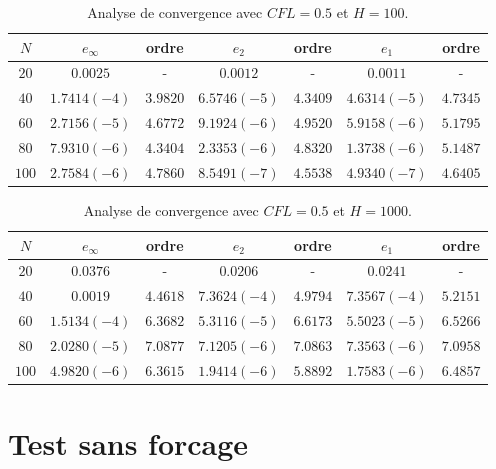 \begin{table}[h]
\begin{center}
\begin{tabular}{c|c|c|c|c|c|c}
$N$ & $e_{\infty}$ & ordre & $e_2$ & ordre & $e_1$ & ordre \\ 
\hline 
\hline
$20$ & $0.0025$ & - & $0.0012$ & - & $0.0011$ & - \\ 
\hline 
$40$ & $1.7414 (-4)$ & $3.9820$ & $6.5746 (-5)$ & $4.3409$ & $4.6314 (-5)$ & $4.7345$ \\ 
\hline 
$60$ & $2.7156 (-5)$ & $4.6772$ & $9.1924 (-6)$ & $4.9520$ & $5.9158 (-6)$ & $5.1795$ \\
\hline 
$80$ & $7.9310 (-6)$ & $4.3404$ & $2.3353 (-6)$ & $4.8320$ & $1.3738 (-6)$ & $5.1487$ \\ 
\hline 
$100$ & $2.7584(-6)$ & $4.7860$ & $8.5491 (-7)$ & $4.5538$ & $4.9340 (-7)$ & $4.6405$  \\ 
\end{tabular} 
\caption{Analyse de convergence avec $CFL=0.5$ et $H=100$.}
\label{CV_order8_hp100}
\end{center}
\end{table}


\begin{table}[h]
\begin{center}
\begin{tabular}{c|c|c|c|c|c|c}
$N$ & $e_{\infty}$ & ordre & $e_2$ & ordre & $e_1$ & ordre \\ 
\hline 
\hline
$20$ & $0.0376$ & - & $0.0206$ & - & $0.0241$ & - \\ 
\hline 
$40$ & $0.0019$ & $4.4618$ & $7.3624 (-4)$ & $4.9794$ & $7.3567 (-4)$ & $5.2151$ \\ 
\hline 
$60$ & $1.5134 (-4)$ & $6.3682$ & $5.3116 (-5)$ & $6.6173$ & $5.5023 (-5)$ & $6.5266$ \\
\hline 
$80$ & $2.0280 (-5)$ & $7.0877$ & $7.1205 (-6)$ & $7.0863$ & $7.3563 (-6)$ & $7.0958$ \\ 
\hline 
$100$ & $4.9820(-6)$ & $6.3615$ & $1.9414 (-6)$ & $5.8892$ & $1.7583 (-6)$ & $6.4857$  \\ 
\end{tabular} 
\caption{Analyse de convergence avec $CFL=0.5$ et $H=1000$.}
\label{CV_order8_hp1000}
\end{center}
\end{table}


\section{Test sans forcage}


